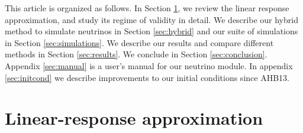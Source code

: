 \documentclass[useAMS, usenatbib]{mnras}
\begin{document}
This article is organized as follows. In Section \ref{sec:lin_resp}, we review the linear response approximation, and study its regime of validity in detail. We describe our hybrid method to simulate neutrinos in Section \ref{sec:hybrid} and our suite of simulations in Section \ref{sec:simulations}. We describe our results and compare different methods in Section \ref{sec:results}. We conclude in Section \ref{sec:conclusion}. Appendix \ref{sec:manual} is a user's manual for our neutrino module. In appendix \ref{sec:initcond} we describe improvements to our initial conditions since AHB13.


\section{Linear-response approximation} \label{sec:lin_resp}
\end{document}
